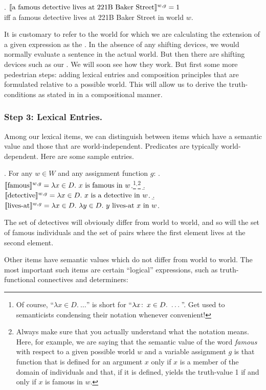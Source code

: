 \ex. $\llbracket \mbox{a famous detective lives at 221B Baker Street} \rrbracket^{w,g} = 1$\\
iff a famous detective lives at 221B Baker Street in world $w$.

It is customary to refer to the world for which we are calculating the extension of a given expression as the . In the absence of any shifting devices, we would normally evaluate a sentence in the actual world. But then there are shifting devices such as our . We will soon see how they work. But first some more pedestrian steps: adding lexical entries and composition principles that are formulated relative to a possible world. This will allow us to derive the truth-conditions as stated in \Last in a compositional manner.

\subsubsection{Step 3: Lexical Entries.} \label{sec:lexical-entries}

Among our lexical items, we can distinguish between items which have a  semantic value and those that are world-independent. Predicates are typically world-dependent. Here are some sample entries.

\ex. For any $w \in W$ and any assignment function $g$:
\a. $\llbracket \mbox{famous} \rrbracket^{w,g} = \lambda x \in D.\ x \mbox{ is famous in } w$.\footnote{Of course, ``$\lambda x \in D.\ \dots$'' is short for ``$\lambda x\co x \in D.\ \dots$''. Get used to semanticists condensing their notation whenever convenient!}$^{,}$\footnote{Always make sure that you actually understand what the notation means. Here, for example, we are saying that the semantic value of the word \emph{famous} with respect to a given possible world $w$ and a variable assignment $g$ is that function that is defined for an argument $x$ only if $x$ is a member of the domain of individuals and that, if it is defined, yields the truth-value 1 if and only if $x$ is famous in $w$.}
\b. $\llbracket \mbox{detective} \rrbracket^{w,g} = \lambda x \in D.\ x \mbox{ is a detective in } w$. 
\b. $\sv{\mbox{lives-at}}^{w,g} = \lambda x \in D.\ \lambda y \in D.\ y \mbox{ lives-at } x \mbox{ in } w $.

The set of detectives will obviously differ from world to world, and so will the set of famous individuals and the set of pairs where the first element lives at the second element.

Other items have semantic values which do not differ from world to world. The most important such items are certain ``logical'' expressions, such as truth-functional connectives and determiners:

